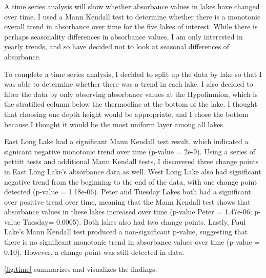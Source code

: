 \documentclass[12pt,]{article}
\newenvironment{Shaded}{\begin{snugshade}}{\end{snugshade}}
\newcommand{\KeywordTok}[1]{\textcolor[rgb]{0.13,0.29,0.53}{\textbf{#1}}}
\newcommand{\StringTok}[1]{\textcolor[rgb]{0.31,0.60,0.02}{#1}}
\newcommand{\CommentTok}[1]{\textcolor[rgb]{0.56,0.35,0.01}{\textit{#1}}}
\newcommand{\OperatorTok}[1]{\textcolor[rgb]{0.81,0.36,0.00}{\textbf{#1}}}
\newcommand{\NormalTok}[1]{#1}
\begin{document}
A time series analysis will show whether absorbance values in lakes have
changed over time. I used a Mann Kendall test to determine whether there
is a monotonic overall trend in absorbance over time for the five lakes
of interest. While there is perhaps seasonality differences in
absorbance values, I am only interested in yearly trends, and so have
decided not to look at seasonal differences of absorbance.

To complete a time series analysis, I decided to split up the data by
lake so that I was able to determine whether there was a trend in each
lake. I also decided to filter the data by only observing absorbance
values at the Hypolimnion, which is the stratified column below the
thermocline at the bottom of the lake. I thought that choosing one depth
height would be appropriate, and I chose the bottom because I thought it
would be the most uniform layer among all lakes.

East Long Lake had a significant Mann Kendall test result, which
indicated a signicant negative monotonic trend over time (p-value =
2e-9). Using a series of pettitt tests and additional Mann Kendall
tests, I discovered three change points in East Long Lake's absorbance
data as well. West Long Lake also had significant negative trend from
the beginning to the end of the data, with one change point detected
(p-value = 1.18e-06). Peter and Tuesday Lakes both had a significant
over positive trend over time, meaning that the Mann Kendall test shows
that absorbance values in these lakes increased over time (p-value Peter
= 1.47e-06; p-value Tuesday= 0.0005). Both lakes also had two change
points. Lastly, Paul Lake's Mann Kendall test produced a non-significant
p-value, suggesting that there is no significant monotonic trend in
absorbance values over time (p-value = 0.10). However, a change point
was still detected in data.

\autoref{fig:time} summarizes and visualizes the findings.

\begin{Shaded}
\end{Shaded}
\end{document}
